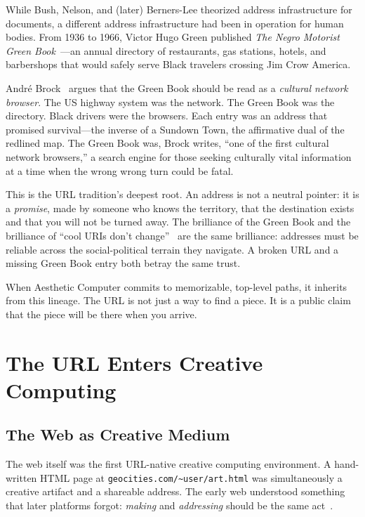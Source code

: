 \documentclass[10pt,letterpaper,twocolumn]{article}
\newcommand{\code}[1]{\texttt{#1}}
\begin{document}
While Bush, Nelson, and (later) Berners-Lee theorized address infrastructure for documents, a different address infrastructure had been in operation for human bodies. From 1936 to 1966, Victor Hugo Green published \emph{The Negro Motorist Green Book}~\citep{green1936greenbook}---an annual directory of restaurants, gas stations, hotels, and barbershops that would safely serve Black travelers crossing Jim Crow America.

Andr\'{e} Brock~\citep{brock2020distributedblackness} argues that the Green Book should be read as a \emph{cultural network browser}. The US highway system was the network. The Green Book was the directory. Black drivers were the browsers. Each entry was an address that promised survival---the inverse of a Sundown Town, the affirmative dual of the redlined map. The Green Book was, Brock writes, ``one of the first cultural network browsers,'' a search engine for those seeking culturally vital information at a time when the wrong wrong turn could be fatal.

This is the URL tradition's deepest root. An address is not a neutral pointer: it is a \emph{promise}, made by someone who knows the territory, that the destination exists and that you will not be turned away. The brilliance of the Green Book and the brilliance of ``cool URIs don't change''~\citep{berners-lee1998cool} are the same brilliance: addresses must be reliable across the social-political terrain they navigate. A broken URL and a missing Green Book entry both betray the same trust.

When Aesthetic Computer commits to memorizable, top-level paths, it inherits from this lineage. The URL is not just a way to find a piece. It is a public claim that the piece will be there when you arrive.

\section{The URL Enters Creative Computing}

\subsection{The Web as Creative Medium}

The web itself was the first URL-native creative computing environment. A hand-written HTML page at \code{geocities.com/\textasciitilde{}user/art.html} was simultaneously a creative artifact and a shareable address. The early web understood something that later platforms forgot: \emph{making} and \emph{addressing} should be the same act~\citep{nelson1974computer}.
\end{document}
